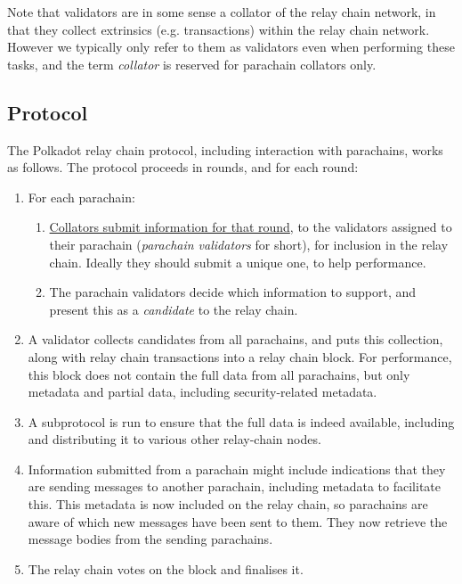 Note that validators are in some sense a collator of the relay chain network, in that they collect extrinsics (e.g. transactions) within the relay chain network. However we typically only refer to them as validators even when performing these tasks, and the term \emph{collator} is reserved for parachain collators only.

\subsection{Protocol}

The Polkadot relay chain protocol, including interaction with parachains, works as follows. The protocol proceeds in rounds, and for each round:

\begin{enumerate}
\item For each parachain:

  \begin{enumerate}
    \item \uline{Collators submit information for that round}, to the validators assigned to their parachain (\emph{parachain validators} for short), for inclusion in the relay chain. Ideally they should submit a unique one, to help performance.
    \item The parachain validators decide which information to support, and present this as a \emph{candidate} to the relay chain.
  \end{enumerate}
  

\item A validator collects candidates from all parachains, and puts this collection, along with relay chain transactions into a relay chain block. For performance, this block does not contain the full data from all parachains, but only metadata and partial data, including security-related metadata.

\item A subprotocol is run to ensure that the full data is indeed available, including and distributing it to various other relay-chain nodes.



\item Information submitted from a parachain might include indications that they are sending messages to another parachain, including metadata to facilitate this. This metadata is now included on the relay chain, so parachains are aware of which new messages have been sent to them. They now retrieve the message bodies from the sending parachains.

\item The relay chain votes on the block and finalises it. %

\end{enumerate}

